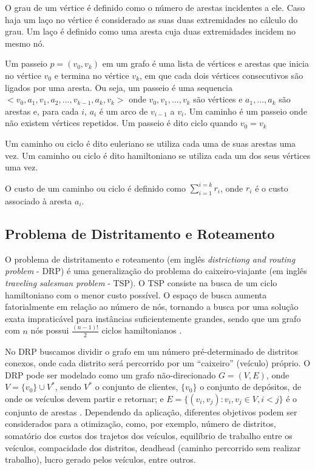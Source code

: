 \documentclass[12pt]{elsarticle}
\begin{document}
    O grau de um vértice é definido como o número de arestas incidentes a ele. Caso haja um laço no vértice é considerado as suas duas extremidades no cálculo do grau. Um laço é definido como uma aresta cuja duas extremidades incidem no mesmo nó.
    
    Um passeio $p=(v_0,v_k)$ em um grafo é uma lista de vértices e arestas que inicia no vértice $v_0$ e termina no vértice $v_k$, em que cada dois vértices consecutivos são ligados por uma aresta. Ou seja, um passeio é uma sequencia $<v_0, a_1, v_1, a_2, ... , v_{k-1}, a_k, v_k>$ onde $v_0, v_1, ... , v_k$ são vértices e $a_1, ... , a_k$ são arestas e, para cada $i$, $a_i$ é um arco de $v_{i-1}$ a $v_i$. Um caminho é um passeio onde não existem vértices repetidos. Um passeio é dito ciclo quando $v_0 = v_k$
    
    Um caminho ou ciclo é dito euleriano se utiliza cada uma de suas arestas uma vez. Um caminho ou ciclo é dito hamiltoniano se utiliza cada um dos seus vértices uma vez.
    
    O custo de um caminho ou ciclo é definido como $\sum_{i=1}^{i=k}r_i$, onde $r_i$ é o custo associado à aresta $a_i$.
    
    \subsection{Problema de Distritamento e Roteamento}
    
    O problema de distritamento e roteamento (em inglês \textit{districtiong and routing problem} - DRP) é uma generalização do problema do caixeiro-viajante (em inglês \textit{traveling salesman problem} - TSP). O TSP consiste na busca de um ciclo hamiltoniano com o menor custo possível. O espaço de busca aumenta fatorialmente em relação ao número de nós, tornando a busca por uma solução exata impraticável para instâncias suficientemente grandes, sendo que um grafo com $n$ nós possui $\frac{(n-1)!}{2}$ ciclos hamiltonianos \cite{agarwal}. 
    
    No DRP buscamos dividir o grafo em um número pré-determinado de distritos conexos, onde cada distrito será percorrido por um “caixeiro” (veículo) próprio. O DRP pode ser modelado como um grafo não-direcionado $G=(V,E)$, onde $V = \{v_0\} \cup V^*$, sendo $V^*$ o conjunto de clientes, $\{v_0\}$ o conjunto de depósitos, de onde os veículos devem partir e retornar; e $E = \{(v_i, v_j): v_i,v_j \in V, i<j\}$ é o conjunto de arestas \cite{wang}. Dependendo da aplicação, diferentes objetivos podem ser considerados para a otimização, como, por exemplo, número de distritos, somatório dos custos dos trajetos dos veículos, equilíbrio de trabalho entre os veículos, compacidade dos distritos, deadhead (caminho percorrido sem realizar trabalho), lucro gerado pelos veículos, entre outros.
    
\end{document}
